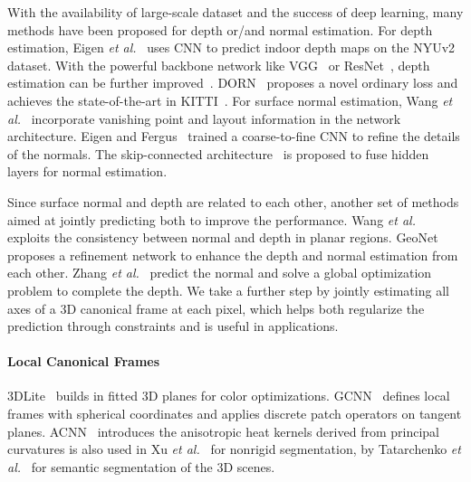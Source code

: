 With the availability of large-scale dataset and the success of deep learning, many methods have been proposed for depth or/and normal estimation. For depth estimation, Eigen \textit{et al.}~\cite{eigen2014depth} uses CNN to predict indoor depth maps on the NYUv2 dataset. With the powerful backbone network like VGG~\cite{simonyan2014very} or ResNet~\cite{he2016deep}, depth estimation can be further improved~\cite{garg2016unsupervised,xie2016deep3d}. DORN~\cite{fu2018deep} proposes a novel ordinary loss and achieves the state-of-the-art in KITTI~\cite{geiger2013vision}. For surface normal estimation, Wang \textit{et al.}~\cite{wang2015designing} incorporate vanishing point and layout information in the network architecture. Eigen and Fergus~\cite{eigen2015predicting} trained a coarse-to-fine CNN to refine the details of the normals. The skip-connected architecture~\cite{bansal2016marr} is proposed to fuse hidden layers for normal estimation.

Since surface normal and depth are related to each other, another set of methods aimed at jointly predicting both to improve the performance. Wang \textit{et al.}~\cite{wang2016surge} exploits the consistency between normal and depth in planar regions. GeoNet~\cite{qi2018geonet} proposes a refinement network to enhance the depth and normal estimation from each other. Zhang \textit{et al.}~\cite{zhang2018deep} predict the normal and solve a global optimization problem to complete the depth.  We take a further step by jointly estimating all axes of a 3D canonical frame at each pixel, which helps both regularize the prediction through constraints and is useful in applications.

\paragraph*{Local Canonical Frames}
 3DLite~\cite{huang20173dlite} builds \cframe{} in fitted 3D planes for color optimizations. GCNN~\cite{masci2015geodesic} defines local frames with spherical coordinates and applies discrete patch operators on tangent planes. ACNN~\cite{boscaini2016learning} introduces the anisotropic heat kernels derived from principal curvatures  is also used in Xu \textit{et al.}~\cite{xu2017directionally} for nonrigid segmentation, by Tatarchenko \textit{et al.}~\cite{tatarchenko2018tangent,huang2018texturenet} for semantic segmentation of the 3D scenes. 

